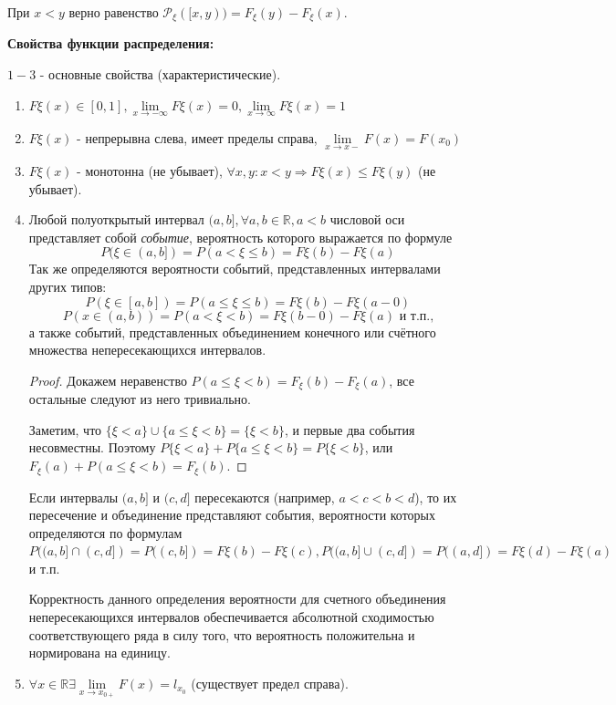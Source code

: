 \begin{remark}
	При $x < y$ верно равенство $\mathcal{P}_{\xi} ( [x, y) ) = F_{\xi} (y) - F_{\xi} (x)$.
\end{remark}

\textbf{Свойства функции распределения:}

\noindent $1-3$ - основные свойства (характеристические).

\begin{enumerate}
	\item $F\xi (x) \in [0, 1], \lim\limits_{x \to - \infty} F\xi (x) = 0, \lim\limits_{x \to \infty} F\xi (x) = 1$
	\item $F\xi (x)$ - непрерывна слева, имеет пределы справа, $\lim\limits_{x \to x-} F(x) = F(x_0)$
	\item $F\xi (x)$ - монотонна (не убывает), $\forall x, y : x < y \Rightarrow F\xi (x) \le F\xi (y)$ (не убывает).
	\item Любой полуоткрытый интервал $(a, b], \forall a, b \in \mathbb{R}, a < b$ числовой оси представляет собой \textit{событие}, вероятность которого выражается по формуле
	\[ P(\xi \in (a, b]) = P(a < \xi \le b) = F\xi (b) - F\xi (a) \]
	Так же определяются вероятности событий, представленных интервалами других типов:
	\[ P(\xi \in [a, b]) = P(a \le \xi \le b) = F\xi (b) - F\xi (a - 0) \]
	\[ P(x \in (a, b)) = P(a < \xi < b) = F\xi (b - 0) - F\xi (a) \text{ и т.п.,} \]
	а также событий, представленных объединением конечного или счётного множества непересекающихся интервалов.
	
	\begin{proof}
		Докажем неравенство $P(a \le \xi < b) = F_{\xi} (b) - F_{\xi}(a)$, все остальные следуют из него тривиально.
		
		Заметим, что $\{ \xi < a \} \cup \{ a \le \xi < b \} = \{ \xi < b \}$, и первые два события несовместны. Поэтому $P \{ \xi < a \} + P \{ a \le \xi < b \} = P \{ \xi < b \}$, или $F_{\xi} (a) + P(a \le \xi < b) = F_{\xi}(b)$.
	\end{proof}
	
	Если интервалы $(a, b]$ и $(c, d]$ пересекаются (например, $a < c < b < d$), то их пересечение и объединение представляют события, вероятности которых определяются по формулам $P((a, b] \cap (c, d]) = P((c, b]) = F\xi (b) - F\xi (c), P((a, b] \cup (c, d]) = P((a, d]) = F\xi (d) - F\xi (a)$ и т.п.
	
	Корректность данного определения вероятности для счетного объединения непересекающихся
	интервалов обеспечивается абсолютной сходимостью соответствующего ряда в силу того, что вероятность положительна и нормирована на единицу.
	\item $\forall x \in \mathbb{R} \exists \lim\limits_{x \to x_{0+}} F(x) = l_{x_0}$ (существует предел справа).
\end{enumerate}

